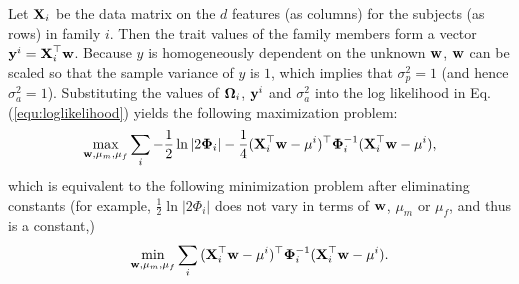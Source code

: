 \documentclass[10pt,letterpaper]{article}
\newcommand{\matrx}[1]{\ensuremath\boldsymbol{\rm #1}}
\newcommand{\vect}[1]{\ensuremath\boldsymbol{\rm #1}}
\begin{document}
Let $\matrx X_i$ be the data matrix on the $d$ features (as columns) for the subjects (as rows) in family $i$. Then the trait values of the family members form a vector $\vect y^i = \matrx X_i ^\top \vect w$. Because $y$ is homogeneously dependent on the unknown $\vect w$, $\vect w$ can be scaled so that the sample variance of $y$ is $1$, which implies that $\sigma_p^2 = 1$ (and hence $\sigma_a^2 = 1$). Substituting the values of $\matrx \Omega_i$, $\vect y^i$ and $\sigma_a^2$ into the log likelihood in Eq.(\ref{equ:loglikelihood}) yields the following maximization problem: 
\begin{equation}
\label{equ:loglikehood_raw}
\max_{\vect w, \mu_m, \mu_f} \sum_i{-\frac{1}{2}\ln |2\matrx \Phi_i| - \frac{1}{4}(\matrx X_i ^\top \vect w-\mu^i)^\top \matrx \Phi_i^{-1}(\matrx X_i ^\top \vect w-\mu^i)}, \nonumber
\end{equation}
which is equivalent to the following minimization problem after eliminating constants (for example, $\frac{1}{2}\ln{|2 \Phi_i|}$ does not vary in terms of $\vect w$, $\mu_m$ or $\mu_f$, and thus is a constant,)
\begin{equation}
\label{equ:hh_obj1}
\min_{\vect w,\mu_m,\mu_f} \sum_i{(\matrx X_i^\top \vect w -\mu^i)^\top \matrx \Phi_i^{-1} (\matrx X_i^\top \vect w -\mu^i)}.
\end{equation}
\end{document}
